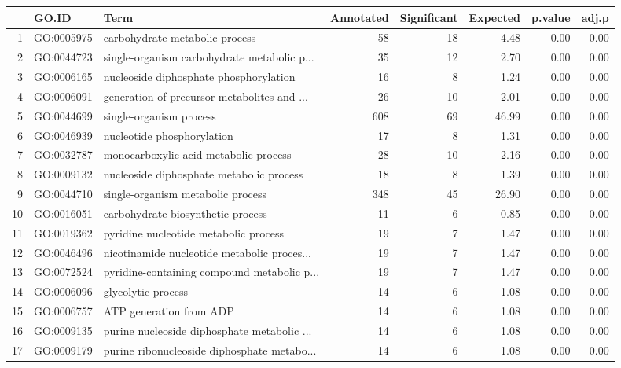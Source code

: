 \begin{table}[ht]
\centering
\begin{tabular}{rllrrrrr}
  \hline
 & GO.ID & Term & Annotated & Significant & Expected & p.value & adj.p \\ 
  \hline
1 & GO:0005975 & carbohydrate metabolic process &  58 &  18 & 4.48 & 0.00 & 0.00 \\ 
  2 & GO:0044723 & single-organism carbohydrate metabolic p... &  35 &  12 & 2.70 & 0.00 & 0.00 \\ 
  3 & GO:0006165 & nucleoside diphosphate phosphorylation &  16 &   8 & 1.24 & 0.00 & 0.00 \\ 
  4 & GO:0006091 & generation of precursor metabolites and ... &  26 &  10 & 2.01 & 0.00 & 0.00 \\ 
  5 & GO:0044699 & single-organism process & 608 &  69 & 46.99 & 0.00 & 0.00 \\ 
  6 & GO:0046939 & nucleotide phosphorylation &  17 &   8 & 1.31 & 0.00 & 0.00 \\ 
  7 & GO:0032787 & monocarboxylic acid metabolic process &  28 &  10 & 2.16 & 0.00 & 0.00 \\ 
  8 & GO:0009132 & nucleoside diphosphate metabolic process &  18 &   8 & 1.39 & 0.00 & 0.00 \\ 
  9 & GO:0044710 & single-organism metabolic process & 348 &  45 & 26.90 & 0.00 & 0.00 \\ 
  10 & GO:0016051 & carbohydrate biosynthetic process &  11 &   6 & 0.85 & 0.00 & 0.00 \\ 
  11 & GO:0019362 & pyridine nucleotide metabolic process &  19 &   7 & 1.47 & 0.00 & 0.00 \\ 
  12 & GO:0046496 & nicotinamide nucleotide metabolic proces... &  19 &   7 & 1.47 & 0.00 & 0.00 \\ 
  13 & GO:0072524 & pyridine-containing compound metabolic p... &  19 &   7 & 1.47 & 0.00 & 0.00 \\ 
  14 & GO:0006096 & glycolytic process &  14 &   6 & 1.08 & 0.00 & 0.00 \\ 
  15 & GO:0006757 & ATP generation from ADP &  14 &   6 & 1.08 & 0.00 & 0.00 \\ 
  16 & GO:0009135 & purine nucleoside diphosphate metabolic ... &  14 &   6 & 1.08 & 0.00 & 0.00 \\ 
  17 & GO:0009179 & purine ribonucleoside diphosphate metabo... &  14 &   6 & 1.08 & 0.00 & 0.00 \\ 

\end{tabular}
\end{table}
